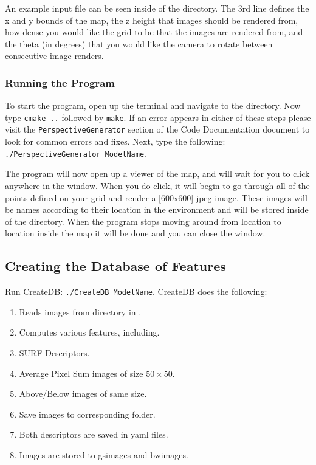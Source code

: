 \documentclass[11pt]{article}
\begin{document}
 An example input file can be seen inside of the  directory. The 3rd line defines the x and y bounds of the map, the z height that images should be rendered from, how dense you would like the grid to be that the images are rendered from, and the theta (in degrees) that you would like the camera to rotate between consecutive image renders.

 \subsubsection{Running the Program}
  To start the program, open up the terminal and navigate to the  directory. Now type \texttt{cmake ..} followed by \texttt{make}. If an error appears in either of these steps please visit the \texttt{PerspectiveGenerator} section of the Code Documentation document to look for common errors and fixes. Next, type the following: \\\verb`./PerspectiveGenerator ModelName`.

  The program will now open up a viewer of the map, and will wait for you to click anywhere in the window. When you do click, it will begin to go through all of the points defined on your grid and render a [600x600] jpeg image. These images will be names according to their location in the environment and will be stored inside of the  directory. When the program stops moving around from location to location inside the map it will be done and you can close the window.

\subsection{Creating the Database of Features}
Run CreateDB: \verb`./CreateDB ModelName`.
CreateDB does the following:
\begin{enumerate}
\item Reads images from directory in .
\item Computes various features, including.
\item SURF Descriptors.
\item Average Pixel Sum images of size $50\times 50$.
\item Above/Below images of same size.
\item Save images to corresponding folder.
\item Both descriptors are saved in yaml files.
\item Images are stored to gsimages and bwimages.
\end{enumerate}
\end{document}
